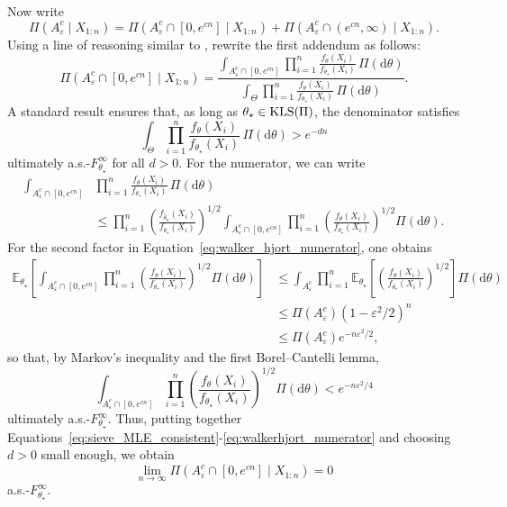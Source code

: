 \documentclass[11pt,twoside]{article}
\newcommand{\kls}{\textnormal{KLS}}
\def\EE{\mathbb{E}}
\begin{document}
Now write
%
\begin{equation}\label{eq:complement_decomposition}
    \Pi(A_\varepsilon^c\mid X_{1:n}) = \Pi(A_\varepsilon^c \cap [0,e^{cn}]\mid X_{1:n}) + \Pi(A_\varepsilon^c \cap (e^{cn},\infty)\mid X_{1:n}).
\end{equation}
%
Using a line of reasoning similar to \cite{walker2001}, rewrite the first addendum as follows:
%
\begin{equation}\label{eq:first_addendum}
    \Pi(A_\varepsilon^c \cap [0,e^{cn}] \mid X_{1:n}) = \frac{\int_{A_\varepsilon^c \cap [0,e^{cn}]}\prod_{i=1}^n\frac{f_\theta(X_i)}{f_{\theta_\star}(X_i)} \,\Pi(\mathrm d\theta)}{\int_{\Theta}\prod_{i=1}^n\frac{f_\theta(X_i)}{f_{\theta_\star}(X_i)} \,\Pi(\mathrm d\theta)}.
\end{equation}
%
A standard result \citep[see, e.g.,][Lemma 4]{barron1999} ensures that, as long as $\theta_\star \in \kls(\Pi)$, the denominator satisfies 
%
\begin{equation}\label{eq:our_denominator}
    \int_{\Theta}\prod_{i=1}^n\frac{f_\theta(X_i)}{f_{\theta_\star}(X_i)} \,\Pi(\mathrm d\theta) > e^{-dn} 
\end{equation}
%
ultimately a.s.-$F_{\theta_\star}^\infty$ for all $d>0$. For the numerator, we can write
%
\begin{align}\label{eq:walker_hjort_numerator}
    \int_{A_\varepsilon^c \cap [0,e^{cn}]}& \prod_{i=1}^n\frac{f_\theta(X_i)}{f_{\theta_\star}(X_i)} \,\Pi(\mathrm d\theta) \nonumber\\
    & \leq \prod_{i=1}^n\left(\frac{f_{\hat\theta_n}(X_i)}{f_{\theta_\star}(X_i)}\right)^{1/2} \int_{A_\varepsilon^c \cap [0,e^{cn}]}\prod_{i=1}^n\left(\frac{f_\theta(X_i)}{f_{\theta_\star}(X_i)}\right)^{1/2} \Pi(\mathrm d\theta).
\end{align}
%
For the second factor in Equation~\eqref{eq:walker_hjort_numerator}, one obtains
%
\begin{align*}
    \mathbb E_{\theta_\star}\left[\int_{A_\varepsilon^c \cap [0,e^{cn}]}\prod_{i=1}^n\left(\frac{f_\theta(X_i)}{f_{\theta_\star}(X_i)}\right)^{1/2} \Pi(\mathrm d\theta)\right] &\leq \int_{A_\varepsilon^c}\prod_{i=1}^n\EE_{\theta_\star}\left[\left(\frac{f_\theta(X_i)}{f_{\theta_\star}(X_i)}\right)^{1/2}\right] \Pi(\mathrm d\theta) \\
    & \leq \Pi(A_\varepsilon^c) (1-\varepsilon^2/2)^n \\
    & \leq \Pi(A_\varepsilon^c) e^{-n\varepsilon^2/2},
\end{align*}
%
so that, by Markov's inequality and the first Borel–Cantelli lemma,
%
\begin{equation}\label{eq:walkerhjort_numerator}
    \int_{A_\varepsilon^c \cap [0,e^{cn}]}\prod_{i=1}^n\left(\frac{f_\theta(X_i)}{f_{\theta_\star}(X_i)}\right)^{1/2} \Pi(\mathrm d\theta) < e^{-n\varepsilon^2/4}
\end{equation}
%
ultimately a.s.-$F_{\theta_\star}^\infty$. Thus, putting together Equations~\eqref{eq:sieve_MLE_consistent}-\eqref{eq:walkerhjort_numerator} and choosing $d>0$ small enough, we obtain
%
\begin{equation*}
    \lim_{n\to\infty}\Pi(A_\varepsilon^c \cap [0,e^{cn}]\mid X_{1:n}) =0
\end{equation*}
%
a.s.-$F_{\theta_\star}^\infty$.
\end{document}
